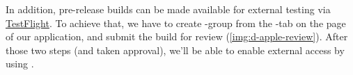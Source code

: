 
\noindent In addition, pre-release builds can be made available for external testing via
\href{https://testflight.apple.com/a}{TestFlight}. To achieve that, we have to create -group from
the -tab on the page of our application, and submit the build for review (\cref{img:d-apple-review}).
After those two steps (and taken approval), we'll be able to enable external access by using .

